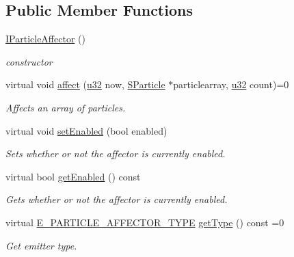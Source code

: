 \subsection*{Public Member Functions}
\begin{DoxyCompactItemize}
\item 
\mbox{\label{classirr_1_1scene_1_1IParticleAffector_a060c7080c8c619e9bb2d35c7ac981889}} 
\hyperlink{classirr_1_1scene_1_1IParticleAffector_a060c7080c8c619e9bb2d35c7ac981889}{I\+Particle\+Affector} ()
\begin{DoxyCompactList}\small\item\em constructor \end{DoxyCompactList}\item 
virtual void \hyperlink{classirr_1_1scene_1_1IParticleAffector_a87fb9116bb1a4d3ea075c59f3e2d1dbc}{affect} (\hyperlink{namespaceirr_a0416a53257075833e7002efd0a18e804}{u32} now, \hyperlink{structirr_1_1scene_1_1SParticle}{S\+Particle} $\ast$particlearray, \hyperlink{namespaceirr_a0416a53257075833e7002efd0a18e804}{u32} count)=0
\begin{DoxyCompactList}\small\item\em Affects an array of particles. \end{DoxyCompactList}\item 
\mbox{\label{classirr_1_1scene_1_1IParticleAffector_aa3715a5686640a180462ad7843aaff0b}} 
virtual void \hyperlink{classirr_1_1scene_1_1IParticleAffector_aa3715a5686640a180462ad7843aaff0b}{set\+Enabled} (bool enabled)
\begin{DoxyCompactList}\small\item\em Sets whether or not the affector is currently enabled. \end{DoxyCompactList}\item 
\mbox{\label{classirr_1_1scene_1_1IParticleAffector_a5665add84311a13c2dbfed3a77670cae}} 
virtual bool \hyperlink{classirr_1_1scene_1_1IParticleAffector_a5665add84311a13c2dbfed3a77670cae}{get\+Enabled} () const
\begin{DoxyCompactList}\small\item\em Gets whether or not the affector is currently enabled. \end{DoxyCompactList}\item 
\mbox{\label{classirr_1_1scene_1_1IParticleAffector_add5652cd7dabb91342497fed776e2557}} 
virtual \hyperlink{namespaceirr_1_1scene_a34c0f9475cfcbda8b50ad816a046010b}{E\+\_\+\+P\+A\+R\+T\+I\+C\+L\+E\+\_\+\+A\+F\+F\+E\+C\+T\+O\+R\+\_\+\+T\+Y\+PE} \hyperlink{classirr_1_1scene_1_1IParticleAffector_add5652cd7dabb91342497fed776e2557}{get\+Type} () const =0
\begin{DoxyCompactList}\small\item\em Get emitter type. \end{DoxyCompactList}\end{DoxyCompactItemize}
